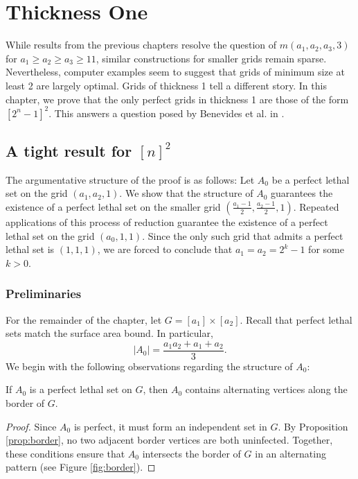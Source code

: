 \chapter{Thickness One}

While results from the previous chapters resolve the question of $m(a_1,a_2,a_3,3)$ for $a_1 \geq a_2 \geq a_3 \geq 11$, similar constructions for smaller grids remain sparse. Nevertheless, computer examples seem to suggest that grids of minimum size at least 2 are largely optimal. Grids of thickness 1 tell a different story. In this chapter, we prove that the only perfect grids in thickness 1 are those of the form $[2^n-1]^2$. This answers a question posed by Benevides et al. in \cite{benevides}.

\section{A tight result for $[n]^2$}
The argumentative structure of the proof is as follows: Let $A_0$ be a perfect lethal set on the grid $(a_1, a_2, 1)$. We show that the structure of $A_0$ guarantees the existence of a perfect lethal set on the smaller grid $(\frac{a_1-1}{2}, \frac{a_2-1}{2}, 1)$. Repeated applications of this process of reduction guarantee the existence of a perfect lethal set on the grid $(a_0, 1,1)$. Since the only such grid that admits a perfect lethal set is $(1,1,1)$, we are forced to conclude that $a_1 = a_2 = 2^k-1$ for some $k > 0$. 

\subsection{Preliminaries}
For the remainder of the chapter, let $G = [a_1] \times [a_2]$. Recall that perfect lethal sets match the surface area bound. In particular,
$$|A_0| = \frac{a_1a_2 + a_1 + a_2}{3}.$$
We begin with the following observations regarding the structure of $A_0$:

\begin{prop}
\label{prop:alternating_border}
If $A_0$ is a perfect lethal set on $G$, then $A_0$ contains alternating vertices along the border of $G$. 
\end{prop}

\begin{proof}
Since $A_0$ is perfect, it must form an independent set in $G$. By Proposition \ref{prop:border}, no two adjacent border vertices are both uninfected. Together, these conditions ensure that $A_0$ intersects the border of $G$ in an alternating pattern (see Figure \ref{fig:border}). 
\end{proof}

